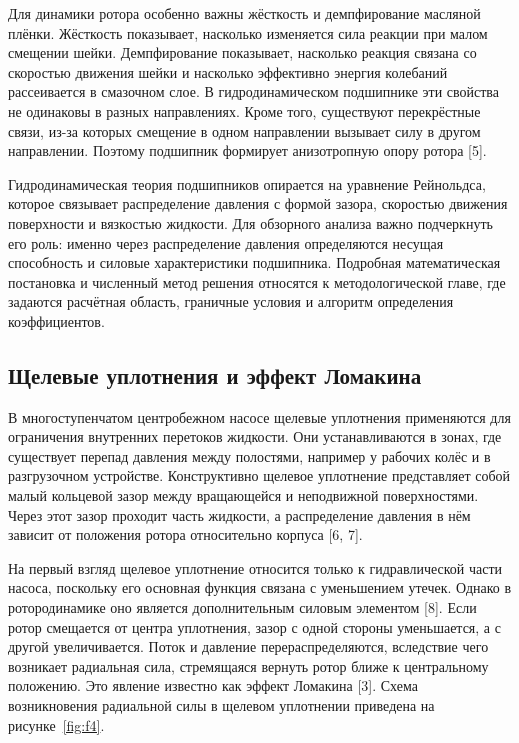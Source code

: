 Для динамики ротора особенно важны жёсткость и демпфирование масляной плёнки. Жёсткость показывает, насколько изменяется сила реакции при малом смещении шейки. Демпфирование показывает, насколько реакция связана со скоростью движения шейки и насколько эффективно энергия колебаний рассеивается в смазочном слое. В гидродинамическом подшипнике эти свойства не одинаковы в разных направлениях. Кроме того, существуют перекрёстные связи, из-за которых смещение в одном направлении вызывает силу в другом направлении. Поэтому подшипник формирует анизотропную опору ротора [5].

Гидродинамическая теория подшипников опирается на уравнение Рейнольдса, которое связывает распределение давления с формой зазора, скоростью движения поверхности и вязкостью жидкости. Для обзорного анализа важно подчеркнуть его роль: именно через распределение давления определяются несущая способность и силовые характеристики подшипника. Подробная математическая постановка и численный метод решения относятся к методологической главе, где задаются расчётная область, граничные условия и алгоритм определения коэффициентов.

\subsection{Щелевые уплотнения и эффект Ломакина}

В многоступенчатом центробежном насосе щелевые уплотнения применяются для ограничения внутренних перетоков жидкости. Они устанавливаются в зонах, где существует перепад давления между полостями, например у рабочих колёс и в разгрузочном устройстве. Конструктивно щелевое уплотнение представляет собой малый кольцевой зазор между вращающейся и неподвижной поверхностями. Через этот зазор проходит часть жидкости, а распределение давления в нём зависит от положения ротора относительно корпуса [6, 7].

На первый взгляд щелевое уплотнение относится только к гидравлической части насоса, поскольку его основная функция связана с уменьшением утечек. Однако в ротородинамике оно является дополнительным силовым элементом [8]. Если ротор смещается от центра уплотнения, зазор с одной стороны уменьшается, а с другой увеличивается. Поток и давление перераспределяются, вследствие чего возникает радиальная сила, стремящаяся вернуть ротор ближе к центральному положению. Это явление известно как эффект Ломакина [3]. Схема возникновения радиальной силы в щелевом уплотнении приведена на рисунке~\ref{fig:f4}.

